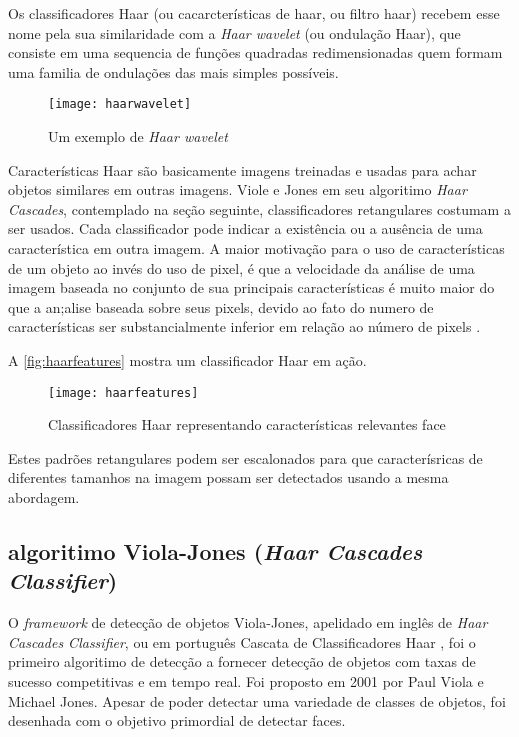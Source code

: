 Os classificadores Haar (ou cacarcterísticas de haar, ou filtro haar) recebem esse nome pela sua similaridade com a \textit{Haar wavelet} (ou ondulação Haar), que consiste em uma sequencia de funções quadradas redimensionadas quem formam uma familia de ondulações das mais simples possíveis.

 \begin{figure}[h]
 	\centering
 	\texttt{[image: haarwavelet]}
 	\caption{Um exemplo de \textit{Haar wavelet}}
 	\label{fig:haarwavelet}
 \end{figure}

Características Haar são basicamente imagens treinadas e usadas para achar objetos similares em outras imagens. Viole e Jones em seu algoritimo \textit{Haar Cascades}, contemplado na seção seguinte, classificadores retangulares costumam a ser usados. Cada classificador pode indicar a existência ou a ausência de uma característica em outra imagem. A maior motivação para o uso de características de um objeto ao invés do uso de pixel, é que a velocidade da análise de uma imagem baseada no conjunto de sua principais características é muito maior do que a an;alise baseada sobre seus pixels, devido ao fato do numero de características ser substancialmente inferior em relação ao número de pixels \cite{gustavo_cascata}.

A \autoref{fig:haarfeatures} mostra um classificador Haar em ação.

 \begin{figure}[h]
	\centering
	\texttt{[image: haarfeatures]}
	\caption{Classificadores Haar representando características relevantes face}
	\label{fig:haarfeatures}
\end{figure}

Estes padrões retangulares podem ser escalonados para que caracterísricas de diferentes tamanhos na imagem possam ser detectados usando a mesma abordagem.


\subsection{algoritimo Viola-Jones (\textit{Haar Cascades Classifier}) }\label{subsubsec:violajones}

O \textit{framework} de detecção de objetos Viola-Jones, apelidado em inglês de \textit{Haar Cascades Classifier}, ou em português Cascata de Classificadores Haar \cite{gustavo_cascata}, foi o primeiro algoritimo de detecção a fornecer detecção de objetos com taxas de sucesso competitivas e em tempo real. Foi proposto em 2001 por Paul Viola e Michael Jones. Apesar de poder detectar uma variedade de classes de objetos, foi desenhada com o objetivo primordial de detectar faces.

